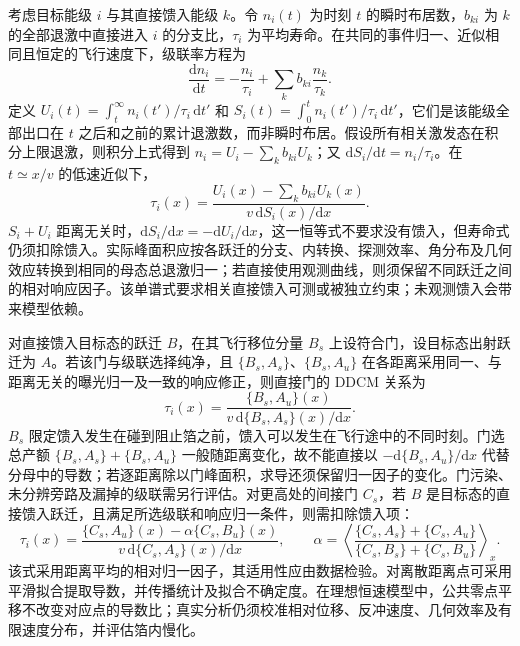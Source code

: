 考虑目标能级 $i$ 与其直接馈入能级 $k$。令 $n_i(t)$ 为时刻 $t$ 的瞬时布居数，$b_{ki}$ 为 $k$ 的全部退激中直接进入 $i$ 的分支比，$\tau_i$ 为平均寿命。在共同的事件归一、近似相同且恒定的飞行速度下，级联率方程为
\begin{equation}\label{eq:5-8-rate-eq}
\frac{\mathrm d n_i}{\mathrm dt}=-\frac{n_i}{\tau_i}+\sum_k b_{ki}\frac{n_k}{\tau_k}.
\end{equation}
定义 $U_i(t)=\int_t^\infty n_i(t')/\tau_i\,\mathrm dt'$ 和 $S_i(t)=\int_0^t n_i(t')/\tau_i\,\mathrm dt'$，它们是该能级全部出口在 $t$ 之后和之前的累计退激数，而非瞬时布居。假设所有相关激发态在积分上限退激，则积分上式得到 $n_i=U_i-\sum_k b_{ki}U_k$；又 $\mathrm dS_i/\mathrm dt=n_i/\tau_i$。在 $t\simeq x/v$ 的低速近似下，
\begin{equation}\label{eq:5-8-ddcm-singles}
\tau_i(x)=\frac{U_i(x)-\sum_k b_{ki}U_k(x)}{v\,\mathrm dS_i(x)/\mathrm dx}.
\end{equation}
$S_i+U_i$ 距离无关时，$\mathrm dS_i/\mathrm dx=-\mathrm dU_i/\mathrm dx$，这一恒等式不要求没有馈入，但寿命式仍须扣除馈入。实际峰面积应按各跃迁的分支、内转换、探测效率、角分布及几何效应转换到相同的母态总退激归一；若直接使用观测曲线，则须保留不同跃迁之间的相对响应因子。该单谱式要求相关直接馈入可测或被独立约束；未观测馈入会带来模型依赖。

对直接馈入目标态的跃迁 $B$，在其飞行移位分量 $B_s$ 上设符合门，设目标态出射跃迁为 $A$。若该门与级联选择纯净，且 $\{B_s,A_s\}$、$\{B_s,A_u\}$ 在各距离采用同一、与距离无关的曝光归一及一致的响应修正，则直接门的 DDCM 关系为~\cite{dewald-2012-ddcm-recoil-distance}
\begin{equation}\label{eq:5-8-ddcm-gated}
\tau_i(x)=\frac{\{B_s,A_u\}(x)}{v\,\mathrm d\{B_s,A_s\}(x)/\mathrm dx}.
\end{equation}
$B_s$ 限定馈入发生在碰到阻止箔之前，馈入可以发生在飞行途中的不同时刻。门选总产额 $\{B_s,A_s\}+\{B_s,A_u\}$ 一般随距离变化，故不能直接以 $-\mathrm d\{B_s,A_u\}/\mathrm dx$ 代替分母中的导数；若逐距离除以门峰面积，求导还须保留归一因子的变化。门污染、未分辨旁路及漏掉的级联需另行评估。对更高处的间接门 $C_s$，若 $B$ 是目标态的直接馈入跃迁，且满足所选级联和响应归一条件，则需扣除馈入项：
\[
\tau_i(x)=\frac{\{C_s,A_u\}(x)-\alpha\{C_s,B_u\}(x)}{v\,\mathrm d\{C_s,A_s\}(x)/\mathrm dx},\qquad
\alpha=\left\langle\frac{\{C_s,A_s\}+\{C_s,A_u\}}{\{C_s,B_s\}+\{C_s,B_u\}}\right\rangle_x.
\]
该式采用距离平均的相对归一因子，其适用性应由数据检验。对离散距离点可采用平滑拟合提取导数，并传播统计及拟合不确定度。在理想恒速模型中，公共零点平移不改变对应点的导数比；真实分析仍须校准相对位移、反冲速度、几何效率及有限速度分布，并评估箔内慢化。

